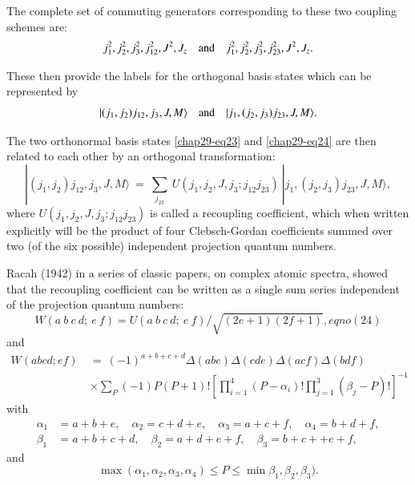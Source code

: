 The complete set of commuting generators corresponding to these two coupling schemes are:
\begin{equation}
j_1^2, j_2^2,j_3^2,j_{12}^2,J^2,J_z\quad {\rm and}\quad j_1^2, j_2^2,j_3^2,j_{23}^2,J^2,J_z. \label{chap29-eq23}
\end{equation}

These then provide the labels for the orthogonal basis states which can be represented by 
\begin{equation}
|(j_1,j_2)j_{12}, j_3, J, M\rangle  \quad {\rm and} \quad |j_1,(j_2,j_3)j_{23}, J, M\rangle. \label{chap29-eq24}
\end{equation}

The two orthonormal basis states \eqref{chap29-eq23} and \eqref{chap29-eq24} are then related to each other by an orthogonal transformation:
\begin{equation}
|(j_1,j_2)j_{12}, j_3, J, M\rangle \ =\ \sum_{j_{23}} \ U(j_1,j_2,J,j_3; j_{12}j_{23})\ |j_1,(j_2,j_3)j_{23}, J, M\rangle, \label{chap29-eq25}
\end{equation}
where $U(j_1,j_2,J,j_3; j_{12}j_{23})$ is called a recoupling coefficient, which when written explicitly will be the product of four Clebsch-Gordan coefficients summed over two (of the six possible) independent projection quantum numbers.

Racah (1942) in a series of classic papers, on complex atomic spectra, showed that the recoupling coefficient can be written as a single sum series independent of the projection quantum numbers:
\begin{equation*}
W(a\ b\ c\ d;\ e\ f) =  U(a\ b\ c\ d;\ e\ f) / \sqrt{(2e+1)(2f+1)}, eqno(24)
\end{equation*}
and
\begin{equation*}
\begin{split}
W(abcd;ef)\ & =\ (-1)^{a+b+c+d} \Delta(abe)\Delta(cde)\Delta(acf)\Delta(bdf) \\
 & \times\sum_P(-1)P (P+1)!\left[ \prod_{i=1}^4 (P-\alpha_i)! \prod_{j=1}^3 (\beta_j-P)! \right]^{-1} \label{chap29-eq25a}
\end{split}
\end{equation*}
with
\begin{equation}
\begin{split}
\alpha_1 & = a+b+e,\quad \alpha_2 = c+d+e, \quad \alpha_3 = a+c+f,\quad \alpha_4 = b+d+f,\\
\beta_1 & = a+b+c+d,\quad \beta_2 = a+d+e+f, \quad \beta_3 = b+c++e+f, \label{chap29-eq26}
\end{split}
\end{equation}
and 
\begin{equation}
\max(\alpha_1,\alpha_2,\alpha_3,\alpha_4)\leq P\leq \min\beta_1,\beta_2,\beta_3). \label{chap29-eq27}
\end{equation}

